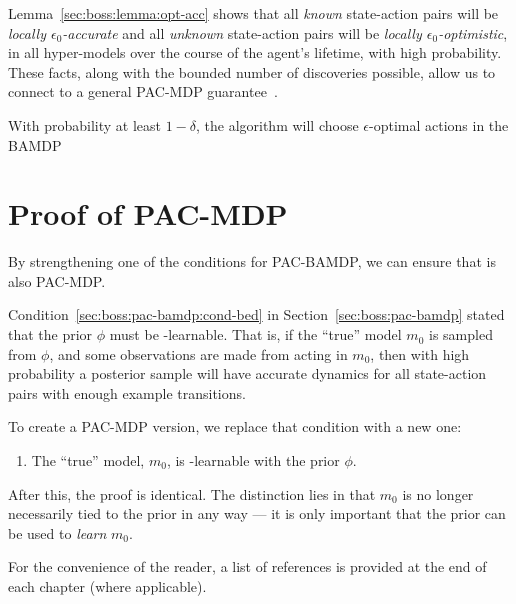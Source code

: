 Lemma~\ref{sec:boss:lemma:opt-acc} shows that all \emph{known} state-action pairs will be \emph{locally $\epsilon_0$-accurate} and all \emph{unknown} state-action pairs will be \emph{locally $\epsilon_0$-optimistic}, in all hyper-models over the course of the agent's lifetime, with high probability. These facts, along with the bounded number of discoveries possible, allow us to connect  to a general PAC-MDP guarantee~\cite{lihong09pacmdp}.

\begin{lemma}
With probability at least $1-\delta$, the  algorithm will choose $\epsilon$-optimal actions in the BAMDP
\end{lemma}



\section{Proof of PAC-MDP}

By strengthening one of the conditions for PAC-BAMDP, we can ensure that  is also PAC-MDP.

Condition~\ref{sec:boss:pac-bamdp:cond-bed} in Section~\ref{sec:boss:pac-bamdp} stated that the prior $\phi$ must be \bed-learnable. That is, if the ``true'' model $m_0$ is sampled from $\phi$, and some observations are made from acting in $m_0$, then with high probability a posterior sample will have accurate dynamics for all state-action pairs with enough example transitions.

To create a PAC-MDP version, we replace that condition with a new one:
\begin{enumerate}
\item The ``true'' model, $m_0$, is \bed-learnable with the prior $\phi$.
\end{enumerate}
After this, the proof is identical. The distinction lies in that $m_0$ is no longer necessarily tied to the prior in any way --- it is only important that the prior can be used to \emph{learn} $m_0$.

%
\ifperchapterbib%
For the convenience of the reader, a list of references is provided at the end of each chapter (where applicable).
\ifendbib%
\else\fi%
\else\fi%
